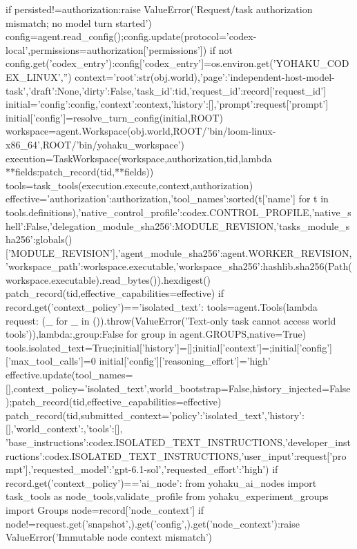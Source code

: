         if persisted!=authorization:raise ValueError('Request/task authorization mismatch; no model turn started')
        config=agent.read_config();config.update(protocol='codex-local',permissions=authorization['permissions'])
        if not config.get('codex_entry'):config['codex_entry']=os.environ.get('YOHAKU_CODEX_LINUX','')
        context={'root':str(obj.world),'page':'independent-host-model-task','draft':None,'dirty':False,'task_id':tid,'request_id':record['request_id']}
        initial={'config':config,'context':context,'history':[],'prompt':request['prompt']}
        initial['config']=resolve_turn_config(initial,ROOT)
        workspace=agent.Workspace(obj.world,ROOT/'bin/loom-linux-x86_64',ROOT/'bin/yohaku_workspace')
        execution=TaskWorkspace(workspace,authorization,tid,lambda **fields:patch_record(tid,**fields))
        tools=task_tools(execution.execute,context,authorization)
        effective={'authorization':authorization,'tool_names':sorted(t['name'] for t in tools.definitions),'native_control_profile':codex.CONTROL_PROFILE,'native_shell':False,'delegation_module_sha256':MODULE_REVISION,'tasks_module_sha256':globals()['MODULE_REVISION'],'agent_module_sha256':agent.WORKER_REVISION,'workspace_path':workspace.executable,'workspace_sha256':hashlib.sha256(Path(workspace.executable).read_bytes()).hexdigest()}
        patch_record(tid,effective_capabilities=effective)
        if record.get('context_policy')=='isolated_text':
            tools=agent.Tools(lambda request: (_ for _ in ()).throw(ValueError('Text-only task cannot access world tools')),lambda:{},{group:False for group in agent.GROUPS},native=True)
            tools.isolated_text=True;initial['history']=[];initial['context']={};initial['config']['max_tool_calls']=0
            initial['config']['reasoning_effort']='high'
            effective.update(tool_names=[],context_policy='isolated_text',world_bootstrap=False,history_injected=False);patch_record(tid,effective_capabilities=effective)
            patch_record(tid,submitted_context={'policy':'isolated_text','history':[],'world_context':{},'tools':[], 'base_instructions':codex.ISOLATED_TEXT_INSTRUCTIONS,'developer_instructions':codex.ISOLATED_TEXT_INSTRUCTIONS,'user_input':request['prompt'],'requested_model':'gpt-6.1-sol','requested_effort':'high'})
        if record.get('context_policy')=='ai_node':
            from yohaku_ai_nodes import task_tools as node_tools,validate_profile
            from yohaku_experiment_groups import Groups
            node=record['node_context']
            if node!=request.get('snapshot',{}).get('config',{}).get('node_context'):raise ValueError('Immutable node context mismatch')

